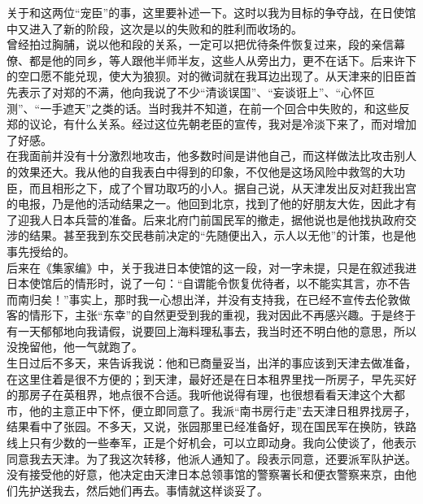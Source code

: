 关于和这两位“宠臣”的事，这里要补述一下。这时以我为目标的争夺战，在日使馆中又进入了新的阶段，这次是以的失败和的胜利而收场的。\\

曾经拍过胸脯，说以他和段的关系，一定可以把优待条件恢复过来，段的亲信幕僚、都是他的同乡，等人跟他半师半友，这些人从旁出力，更不在话下。后来许下的空口愿不能兑现，使大为狼狈。对的微词就在我耳边出现了。从天津来的旧臣首先表示了对郑的不满，他向我说了不少“清谈误国”、“妄谈诳上”、“心怀叵测”、“一手遮天”之类的话。当时我并不知道，在前一个回合中失败的，和这些反郑的议论，有什么关系。经过这位先朝老臣的宣传，我对是冷淡下来了，而对增加了好感。\\

在我面前并没有十分激烈地攻击，他多数时间是讲他自己，而这样做法比攻击别人的效果还大。我从他的自我表白中得到的印象，不仅他是这场风险中救驾的大功臣，而且相形之下，成了个冒功取巧的小人。据自己说，从天津发出反对赶我出宫的电报，乃是他的活动结果之一。他回到北京，找到了他的好朋友大佐，因此才有了迎我人日本兵营的准备。后来北府门前国民军的撤走，据他说也是他找执政府交涉的结果。甚至我到东交民巷前决定的“先随便出入，示人以无他”的计策，也是他事先授给的。\\

后来在《集家编》中，关于我进日本使馆的这一段，对一字未提，只是在叙述我进日本使馆后的情形时，说了一句：“自谓能令恢复优待者，以不能实其言，亦不告而南归矣！”事实上，那时我一心想出洋，并没有支持我，在已经不宣传去伦敦做客的情形下，主张“东幸”的自然更受到我的重视，我对因此不再感兴趣。于是终于有一天郁郁地向我请假，说要回上海料理私事去，我当时还不明白他的意思，所以没挽留他，他一气就跑了。\\

生日过后不多天，来告诉我说：他和已商量妥当，出洋的事应该到天津去做准备，在这里住着是很不方便的；到天津，最好还是在日本租界里找一所房子，早先买好的那房子在英租界，地点很不合适。我听他说得有理，也很想看看天津这个大都市，他的主意正中下怀，便立即同意了。我派“南书房行走”去天津日租界找房子，结果看中了张园。不多天，又说，张园那里已经准备好，现在国民军在换防，铁路线上只有少数的一些奉军，正是个好机会，可以立即动身。我向公使谈了，他表示同意我去天津。为了我这次转移，他派人通知了。段表示同意，还要派军队护送。没有接受他的好意，他决定由天津日本总领事馆的警察署长和便衣警察来京，由他们先护送我去，然后她们再去。事情就这样谈妥了。\\

